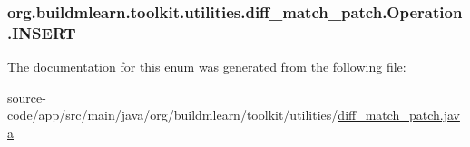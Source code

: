 \subsubsection[{\texorpdfstring{I\+N\+S\+E\+RT}{INSERT}}]{\setlength{\rightskip}{0pt plus 5cm}org.\+buildmlearn.\+toolkit.\+utilities.\+diff\+\_\+match\+\_\+patch.\+Operation.\+I\+N\+S\+E\+RT}\hypertarget{enumorg_1_1buildmlearn_1_1toolkit_1_1utilities_1_1diff__match__patch_1_1Operation_a8b05eca1ef092d3c04fe906fc76f15ce}{}\label{enumorg_1_1buildmlearn_1_1toolkit_1_1utilities_1_1diff__match__patch_1_1Operation_a8b05eca1ef092d3c04fe906fc76f15ce}


The documentation for this enum was generated from the following file\+:\begin{DoxyCompactItemize}
\item 
source-\/code/app/src/main/java/org/buildmlearn/toolkit/utilities/\hyperlink{diff__match__patch_8java}{diff\+\_\+match\+\_\+patch.\+java}\end{DoxyCompactItemize}
